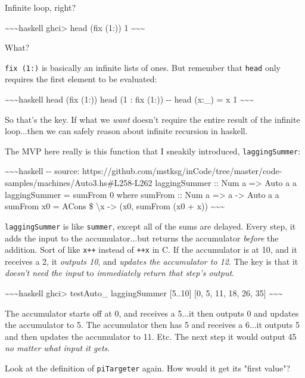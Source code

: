\documentclass[]{article}
\begin{document}
Infinite loop, right?

\textasciitilde{}\textasciitilde{}\textasciitilde{}haskell ghci\textgreater{}
head (fix (1:)) 1 \textasciitilde{}\textasciitilde{}\textasciitilde{}

What?

\texttt{fix\ (1:)} is basically an infinite lists of ones. But remember that
\texttt{head} only requires the first element to be evaluated:

\textasciitilde{}\textasciitilde{}\textasciitilde{}haskell head (fix (1:)) head
(1 : fix (1:)) -\/- head (x:\_) = x 1
\textasciitilde{}\textasciitilde{}\textasciitilde{}

So that's the key. If what we \emph{want} doesn't require the entire result of
the infinite loop...then we can safely reason about infinite recursion in
haskell.

The MVP here really is this function that I sneakily introduced,
\texttt{laggingSummer}:

\textasciitilde{}\textasciitilde{}\textasciitilde{}haskell -\/- source:
https://github.com/mstksg/inCode/tree/master/code-samples/machines/Auto3.hs\#L258-L262
laggingSummer :: Num a =\textgreater{} Auto a a laggingSummer = sumFrom 0 where
sumFrom :: Num a =\textgreater{} a -\textgreater{} Auto a a sumFrom x0 = ACons
\$ \textbackslash{}x -\textgreater{} (x0, sumFrom (x0 + x))
\textasciitilde{}\textasciitilde{}\textasciitilde{}

\texttt{laggingSummer} is like \texttt{summer}, except all of the sums are
delayed. Every step, it adds the input to the accumulator...but returns the
accumulator \emph{before} the addition. Sort of like \texttt{x++} instead of
\texttt{++x} in C. If the accumulator is at 10, and it receives a 2, it
\emph{outputs 10}, and \emph{updates the accumulator to 12}. The key is that it
\emph{doesn't need the input} to \emph{immediately return that step's output}.

\textasciitilde{}\textasciitilde{}\textasciitilde{}haskell ghci\textgreater{}
testAuto\_ laggingSummer {[}5..10{]} {[}0, 5, 11, 18, 26, 35{]}
\textasciitilde{}\textasciitilde{}\textasciitilde{}

The accumulator starts off at 0, and receives a 5...it then outputs 0 and
updates the accumulator to 5. The accumulator then has 5 and receives a 6...it
outputs 5 and then updates the accumulator to 11. Etc. The next step it would
output 45 \emph{no matter what input it gets}.

Look at the definition of \texttt{piTargeter} again. How would it get its "first
value"?
\end{document}

